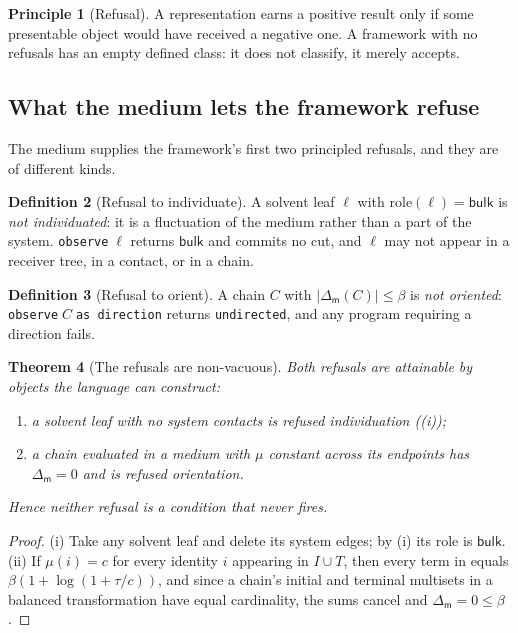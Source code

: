 \documentclass[11pt,twocolumn,a4paper]{article}
\theoremstyle{thmstyle}
\newtheorem{theorem}{Theorem}[section]
\theoremstyle{definition}
\newtheorem{definition}[theorem]{Definition}
\newtheorem{principle}[theorem]{Principle}
\theoremstyle{remark}
\newcommand{\flo}{\beta}
\newcommand{\med}{\mathsf{m}}
\newcommand{\shk}[1]{\texttt{#1}}
\newcommand{\abs}[1]{\lvert#1\rvert}
\newcommand{\Blk}{\textsf{bulk}}
\begin{document}
\begin{principle}[Refusal]
\label{prin:refusal}
A representation earns a positive result only if some presentable object
would have received a negative one. A framework with no refusals has an
empty defined class: it does not classify, it merely accepts.
\end{principle}

\subsection{What the medium lets the framework refuse}

The medium supplies the framework's first two principled refusals, and
they are of different kinds.

\begin{definition}[Refusal to individuate]
\label{def:refuse-leaf}
A solvent leaf $\ell$ with $\mathrm{role}(\ell)=\Blk$ is \emph{not
individuated}: it is a fluctuation of the medium rather than a part of
the system. \shk{observe}$\;\ell$ returns $\Blk$ and commits no cut, and
$\ell$ may not appear in a receiver tree, in a contact, or in a chain.
\end{definition}

\begin{definition}[Refusal to orient]
\label{def:refuse-direction}
A chain $C$ with $\abs{\Delta_{\med}(C)}\le\flo$ is \emph{not oriented}:
\shk{observe}$\;C\;$\shk{as direction} returns \shk{undirected}, and any
program requiring a direction fails.
\end{definition}

\begin{theorem}[The refusals are non-vacuous]
\label{thm:refusal-nonvacuous}
Both refusals are attainable by objects the language can construct:
\begin{enumerate}[label=(\roman*),leftmargin=1.8em,itemsep=2pt]
\item a solvent leaf with no system contacts is refused individuation
((i));
\item a chain evaluated in a medium with $\mu$ constant across its
endpoints has $\Delta_{\med}=0$ and is refused orientation.
\end{enumerate}
Hence neither refusal is a condition that never fires.
\end{theorem}

\begin{proof}
(i) Take any solvent leaf and delete its system edges; by
(i) its role is $\Blk$. (ii) If
$\mu(i)=c$ for every identity $i$ appearing in $I\cup T$, then every term
in  equals $\flo(1+\log(1+\tau/c))$, and since a chain's
initial and terminal multisets in a balanced transformation have equal
cardinality, the sums cancel and $\Delta_{\med}=0\le\flo$.
\end{proof}
\end{document}
